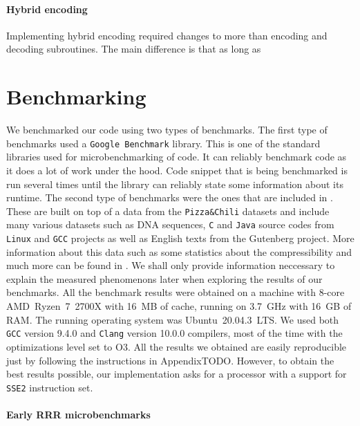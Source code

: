 \paragraph{Hybrid encoding}

Implementing hybrid encoding required changes to more than encoding and decoding
subroutines. The main difference is that as long as 

\section{Benchmarking}

We benchmarked our code using two types of benchmarks. The first type of benchmarks used
a \texttt{Google Benchmark} library. This is one of the standard libraries used for
microbenchmarking of code. It can reliably benchmark code as it does a lot of work
under the hood. Code snippet that is being benchmarked is run several times until the
library can reliably state some information about its runtime. The second type of benchmarks
were the ones that are included in \sdsl. These are built on top of a data from the
\texttt{Pizza\&Chili} datasets \citep{ferragina2005pizza} and include many various datasets such
as DNA sequences, \texttt{C} and \texttt{Java} source codes from \texttt{Linux} and \texttt{GCC}
projects as well as English texts from the Gutenberg project. More information about this
data such as some statistics about the compressibility and much more can be found in
\cite{ferragina2009compressed}. We shall only provide information neccessary to explain the
measured phenomenons later when exploring the results of our benchmarks. All the benchmark
results were obtained on a machine with 8-core AMD~Ryzen~7~2700X with 16~MB of cache, running
on 3.7~GHz with 16~GB of RAM. The running operating system was Ubuntu~20.04.3~LTS.
We used both \texttt{GCC} version 9.4.0 and \texttt{Clang} version 10.0.0 compilers,
most of the time with the optimizations level set to O3. All the results we obtained are
easily reproducible just by following the instructions in AppendixTODO. However, to obtain
the best results possible, our implementation asks for a processor with a support for \texttt{SSE2}
instruction set.

\paragraph{Early RRR microbenchmarks}

